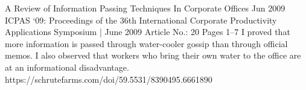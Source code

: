 \publication
{A Review of Information Passing Techniques In Corporate Offices}
{Jun 2009}
{ICPAS ‘09: Proceedings of the 36th International Corporate Productivity Applications Symposium | June 2009 Article No.: 20 Pages 1–7}
{I proved that more information is passed through water-cooler gossip than through official memos. I also observed that workers who bring their own water to the office are at an informational disadvantage.}
{https://schrutefarms.com/doi/59.5531/8390495.6661890}
